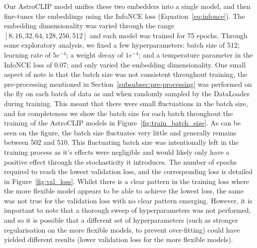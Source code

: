 Our AstroCLIP model unifies these two embedders into a single model, and then fine-tunes the embeddings using the InfoNCE loss
(Equation~\eqref{eq:infonce}).
The embedding dimensionality was varied through the range $[8, 16, 32, 64, 128, 256, 512]$ and each model was trained for
75 epochs.
Through some exploratory analysis, we fixed a few hyperparameters: batch size of 512; learning rate of $5e^{-4}$; a weight
decay of $1e^{-4}$; and a temperature parameter in the InfoNCE loss of 0.07; and only varied the embedding dimensionality.
One small aspect of note is that the batch size was not consistent throughout training, the pre-processing mentioned in
Section~\eqref{subsubsec:pre-processing} was performed on the fly on each batch of data as and when randomly sampled by
the DataLoader during training.
This meant that there were small fluctuations in the batch size, and for completeness we show the batch size for each batch
throughout the training of the AstroCLIP models in Figure~\eqref{fig:train_batch_size}.
As can be seen on the figure, the batch size fluctuates very little and generally remains between 502 and 510.
This fluctuating batch size was intentionally left in the training process as it's effects were negligible and would likely
only have a positive effect through the stochasticity it introduces.
The number of epochs required to reach the lowest validation loss, and the corresponding loss is detailed in Figure~\eqref{fig:val_loss}.
Whilst there is a clear pattern in the training loss where the more flexible model appears to be able to achieve the
lowest loss, the same was not true for the validation loss with no clear pattern emerging.
However, it is important to note that a thorough sweep of hyperparameters was not performed, and so it is possible that
a different set of hyperparameters (such as stronger regularisation on the more flexible models, to prevent over-fitting)
could have yielded different results (lower validation loss for the more flexible models).
